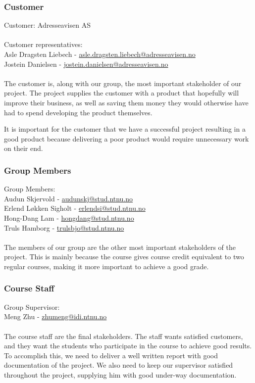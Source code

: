 \subsubsection{Customer}
Customer: Adresseavisen AS\\
\\
Customer representatives:\\
Asle Dragsten Liebech - \href{mailto://asle.dragsten.liebech@adresseavisen.no}{asle.dragsten.liebech@adresseavisen.no}\\
Jostein Danielsen - \href{mailto://josetein.danielsen@adresseavisen.no}{jostein.danielsen@adresseavisen.no}\\
\\
The customer is, along with our group, the most important stakeholder of our project. The project supplies the customer with a product that hopefully will improve their business, as well as saving them money they would otherwise have had to spend developing the product themselves.

It is important for the customer that we have a successful project resulting in a good product because delivering a poor product would require unnecessary work on their end.
\subsubsection{Group Members}
Group Members:\\
Audun Skjervold - \href{mailto://audunskj@stud.ntnu.no}{audunskj@stud.ntnu.no}\\
Erlend Løkken Sigholt - \href{mailto://erlendsi@stud.ntnu.no}{erlendsi@stud.ntnu.no}\\
Hong-Dang Lam - \href{mailto://hongdang@stud.ntnu.no}{hongdang@stud.ntnu.no}\\
Truls Hamborg - \href{mailto://trulsbjo@stud.ntnu.no}{trulsbjo@stud.ntnu.no}\\
\\
The members of our group are the other most important stakeholders of the project. This is mainly because the course gives course credit equivalent to two regular courses, making it more important to achieve a good grade.
\subsubsection{Course Staff}
Group Supervisor:\\
Meng Zhu - \href{mailto://zhumeng@idi.ntnu.no}{zhumeng@idi.ntnu.no}\\
\\
The course staff are the final stakeholders. The staff wants satisfied customers, and they want the students who participate in the course to achieve good results. To accomplish this, we need to deliver a well written report with good documentation of the project. We also need to keep our supervisor satisfied throughout the project, supplying him with good under-way documentation.

